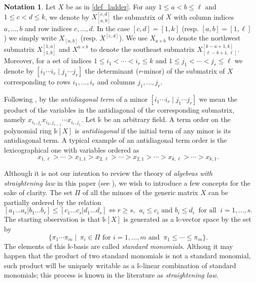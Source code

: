 \documentclass[12pt]{amsart}
\renewcommand{\leq}{\leqslant}
\renewcommand{\geq}{\geqslant}
\theoremstyle{definition}
\newtheorem{notation}[notation]{Notation}
\renewcommand{\(}{\left(}
\renewcommand{\)}{\right)}
\newcommand{\kk}{\mathbb{k}}
\renewcommand{\!}[1]{{\color{red}\text{\Huge$\star$ }#1}}
\newcommand{\ls}{\leqslant}%
\begin{document}
\begin{notation}\label{notation_affine_subsec}
	Let $X$ be as in \autoref{def_ladder}.	For any $1 \leq a <b \leq \ell$ and $1 \leq c<d \leq k$, we denote by $X_{[a,b]}^{[c,d]}$ the submatrix of $X$ with column indices $a,\ldots, b$ and row indices $c,\ldots, d$. 
	In the case $[c,d]=[1,k]$ (resp. $[a,b]=[1,\ell]$ ) we simply write $X_{[a,b]}$ (resp. $X^{[c,d]}$).  
	We use $X_{a \times b}$ to denote the northwest submatrix $X_{[1,b]}^{[1,a]}$ and $X^{a \times b}$ to denote the southeast submatrix $X_{[\ell-b+1 ,\ell]}^{[k-a+1,k]}$. 
	 Moreover, for a set of indices $1\ls i_1<\cdots<i_r\ls k$ and $1\ls j_1<\cdots<j_r\ls \ell$ we denote by $[i_1\cdots i_r\mid j_1\cdots j_r]$ the determinant ($r$-minor) of the submatrix of $X$ corresponding to rows $i_1,\ldots, i_r$ and columns  $j_1,\ldots, j_r$.
\end{notation}

Following \cite{MillerSturmfels}, by the {\it antidiagonal term} of a minor $[i_1\cdots i_r\mid j_1\cdots j_r]$ we mean the product of the variables in the antidiagonal of the corresponding submatrix, namely $x_{i_1,j_r}x_{i_2,j_{r-1}}\cdots x_{i_r,j_1}$. Let $\kk$ be an arbitrary  field.  A term order on the polynomial ring $\kk[X]$ is {\it antidiagonal} if the initial term of any minor is  its antidiagonal term. A typical example of an antidiagonal term order is the lexicographical one with variables ordered as $$x_{1,\ell}>\cdots>x_{1,1}>x_{2,\ell}>\cdots>x_{2,1}>\cdots >x_{k,\ell}>\cdots>x_{k,1}.$$

Although it is not our intention to review the theory of {\it algebras with straightening law} in this paper (see \cite[Chapter 3]{bruns2022determinants}),  we wish to introduce a few concepts for the sake of clarity. The set $\Pi$ of all the minors of the generic matrix $X$ can be partially ordered by the relation
\[[a_1\ldots a_r|b_1\ldots b_r]\leq [c_1\ldots c_s|d_1\ldots d_s] \iff r\geq s, \ \ a_i\leq c_i \mbox{ and } b_i\leq d_i \ \text{ for all } \ i=1,\ldots ,s.\] 
 The starting observation is that $\kk[X]$  is generated %
as a %
$\kk$-vector space by the set %
by
\[\{\pi_1\cdots \pi_m\mid  \ \pi_i\in\Pi \text{ for }i=1,\ldots, m \text{ and } \ \pi_1\leq \cdots \leq \pi_m\}.\]
The elements of this $\kk$-basis are called {\it standard monomials}. Althoug it may happen that the product of two standard monomials is not a standard monomial, such product will be uniquely writable as a $\kk$-linear combination of standard monomials;   %
 this process  is known in the literature as {\it straightening law}. 
 
\end{document}
